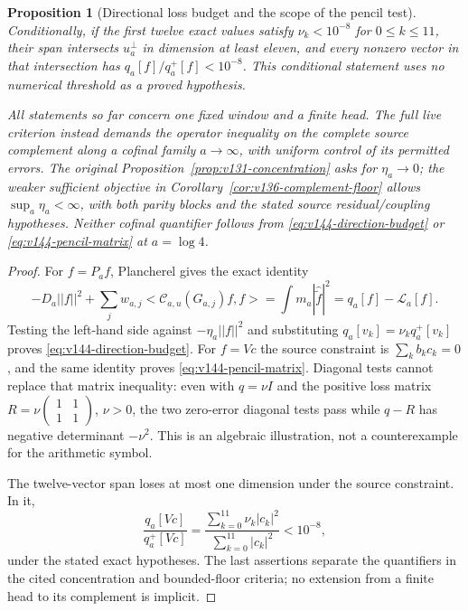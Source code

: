 \documentclass[11pt]{article}
\def\norm#1{||#1||}%
\def\ip#1#2{<#1,#2>}%
\newtheorem{proposition}[theorem]{Proposition}
\theoremstyle{remark}
\newcommand{\norm}[1]{\left\lVert #1\right\rVert}
\newcommand{\ip}[2]{\left\langle #1,#2\right\rangle}
\begin{document}
\begin{proposition}[Directional loss budget and the scope of the pencil test]
Conditionally, if the first twelve \emph{exact} values satisfy
$\nu_k<10^{-8}$ for $0\le k\le11$, their span intersects $u_a^\perp$
in dimension at least eleven, and every nonzero vector in that
intersection has $q_a[f]/q_a^+[f]<10^{-8}$. This conditional statement
uses no numerical threshold as a proved hypothesis.

All statements so far concern one fixed window and a finite head.
The full live criterion instead demands the operator inequality on
the complete source complement along a cofinal family $a\to\infty$,
with uniform control of its permitted errors. The original
Proposition~\ref{prop:v131-concentration} asks for $\eta_a\to0$;
the weaker sufficient objective in
Corollary~\ref{cor:v136-complement-floor} allows
$\sup_a\eta_a<\infty$, with both parity blocks and the stated source
residual/coupling hypotheses. Neither cofinal quantifier follows
from \eqref{eq:v144-direction-budget} or
\eqref{eq:v144-pencil-matrix} at $a=\log4$.
\end{proposition}
\begin{proof}
For $f=P_af$, Plancherel gives the exact identity
\[
 -D_a\norm f^2+\sum_jw_{a,j}
       \ip{\mathcal C_{a,u}(G_{a,j})f}f
 =\int m_a|\widehat{\widetilde f}|^2
 =q_a[f]-\mathcal L_a[f].
\]
Testing the left-hand side against $-\eta_a\norm f^2$ and substituting
$q_a[v_k]=\nu_kq_a^+[v_k]$ proves
\eqref{eq:v144-direction-budget}. For $f=Vc$ the source constraint is
$\sum_kb_kc_k=0$, and the same identity proves
\eqref{eq:v144-pencil-matrix}. Diagonal tests cannot replace that
matrix inequality: even with $q=\nu I$ and the positive loss matrix
$R=\nu\left(\begin{smallmatrix}1&1\\1&1\end{smallmatrix}\right)$,
$\nu>0$, the two zero-error diagonal tests pass while $q-R$ has
negative determinant $-\nu^2$. This is an algebraic illustration,
not a counterexample for the arithmetic symbol.

The twelve-vector span loses at most one dimension under the source
constraint. In it,
\[
 \frac{q_a[Vc]}{q_a^+[Vc]}
   =\frac{\sum_{k=0}^{11}\nu_k|c_k|^2}
          {\sum_{k=0}^{11}|c_k|^2}<10^{-8},
\]
under the stated exact hypotheses. The last assertions separate the
quantifiers in the cited concentration and bounded-floor criteria;
no extension from a finite head to its complement is implicit.
\end{proof}
\end{document}
